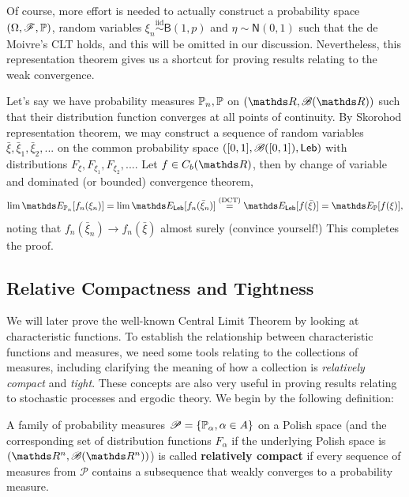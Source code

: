 Of course, more effort is needed to actually construct a probability space $(\Omega, \mathcal{F}, \mathbb{P})$, random variables $\xi_n \overset{\text{iid}}\sim \mathsf{B}(1,p)$ and $\eta \sim \mathsf{N}(0,1)$ such that the de Moivre's CLT holds, and this will be omitted in our discussion. Nevertheless, this representation theorem gives us a shortcut for proving results relating to the weak convergence.

\begin{example}
Let's say we have probability measures $\mathbb{P}_n, \mathbb{P}$ on $(\R,\B(\R))$ such that their distribution function converges at all points of continuity. By Skorohod representation theorem, we may construct a sequence of random variables $\bar{\xi}, \bar{\xi}_1, \bar{\xi}_2,...$ on the common probability space $([0,1], \mathcal{B}([0,1]), \mathsf{Leb})$ with distributions $F_\xi, F_{\xi_1}, F_{\xi_2}, ...$. Let $f \in C_b(\R)$, then by change of variable and dominated (or bounded) convergence theorem, 
\begin{equation*}
    \lim \E_{\p_n} [f_n(\xi_n)] = \lim \E_{\Leb} [f_n(\bar{\xi}_n)] \overset{\text{(DCT)}}{=} \E_{\Leb}[f(\bar{\xi})] = \E_{\p}[f(\xi)],
\end{equation*}
noting that $f_n(\bar{\xi}_n) \to f_n(\bar{\xi})$ almost surely (convince yourself!) This completes the proof.
\end{example}

\subsection{Relative Compactness and Tightness}
We will later prove the well-known Central Limit Theorem by looking at characteristic functions. To establish the relationship between characteristic functions and measures, we need some tools relating to the collections of measures, including clarifying the meaning of how a collection is \textit{relatively compact} and \textit{tight}. These concepts are also very useful in proving results relating to stochastic processes and ergodic theory. We begin by the following definition:

\begin{definition}
A family of probability measures $\mathcal{P} = \{ \mathbb{P}_\alpha, \alpha \in A\}$ on a Polish space (and the corresponding set of distribution functions $F_\alpha$ if the underlying Polish space is $(\R^n, \B(\R^n))$) is called \textbf{relatively compact} if every sequence of measures from $\mathcal{P}$ contains a subsequence that weakly converges to a probability measure.
\end{definition}


